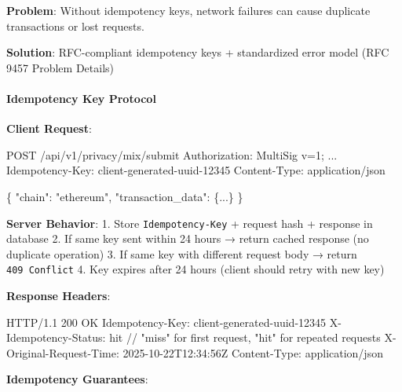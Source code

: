 \documentclass[
  11pt,
]{article}
\newenvironment{Shaded}{\begin{snugshade}}{\end{snugshade}}
\newcommand{\NormalTok}[1]{#1}
\begin{document}
\textbf{Problem}: Without idempotency keys, network failures can cause
duplicate transactions or lost requests.

\textbf{Solution}: RFC-compliant idempotency keys + standardized error
model (RFC 9457 Problem Details)

\hypertarget{idempotency-key-protocol}{%
\paragraph{Idempotency Key Protocol}\label{idempotency-key-protocol}}

\textbf{Client Request}:

\begin{Shaded}
\begin{Highlighting}[]
\NormalTok{POST /api/v1/privacy/mix/submit}
\NormalTok{Authorization: MultiSig v=1; ...}
\NormalTok{Idempotency{-}Key: client{-}generated{-}uuid{-}12345}
\NormalTok{Content{-}Type: application/json}

\NormalTok{\{}
\NormalTok{  "chain": "ethereum",}
\NormalTok{  "transaction\_data": \{...\}}
\NormalTok{\}}
\end{Highlighting}
\end{Shaded}

\textbf{Server Behavior}: 1. Store \texttt{Idempotency-Key} + request
hash + response in database 2. If same key sent within 24 hours → return
cached response (no duplicate operation) 3. If same key with different
request body → return \texttt{409\ Conflict} 4. Key expires after 24
hours (client should retry with new key)

\textbf{Response Headers}:

\begin{Shaded}
\begin{Highlighting}[]
\NormalTok{HTTP/1.1 200 OK}
\NormalTok{Idempotency{-}Key: client{-}generated{-}uuid{-}12345}
\NormalTok{X{-}Idempotency{-}Status: hit  // "miss" for first request, "hit" for repeated requests}
\NormalTok{X{-}Original{-}Request{-}Time: 2025{-}10{-}22T12:34:56Z}
\NormalTok{Content{-}Type: application/json}
\end{Highlighting}
\end{Shaded}

\textbf{Idempotency Guarantees}:
\end{document}
